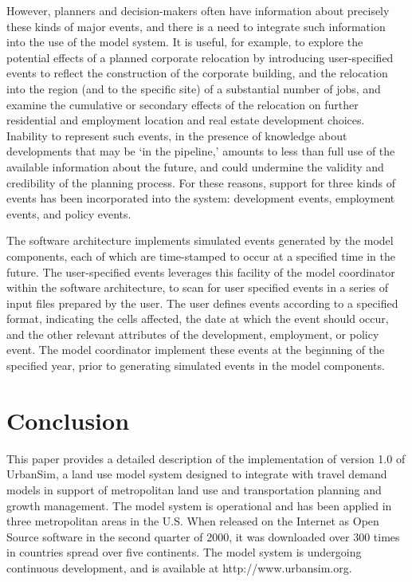 \documentclass[fleqn]{article}
\begin{document}
However, planners and decision-makers often have information about
precisely these kinds of major events, and there is a need to
integrate such information into the use of the model system.  It
is useful, for example, to explore the potential effects of a
planned corporate relocation by introducing user-specified events
to reflect the construction of the corporate building, and the
relocation into the region (and to the specific site) of a
substantial number of jobs, and examine the cumulative or
secondary effects of the relocation on further residential and
employment location and real estate development choices.  Inability
to represent such events, in the presence of knowledge about
developments that may be `in the pipeline,' amounts to less than
full use of the available information about the future, and could
undermine the validity and credibility of the planning process.
For these reasons, support for three kinds of events has been
incorporated into the system: development events, employment
events, and policy events.

The software architecture implements simulated events generated by
the model components, each of which are time-stamped to occur at a
specified time in the future.  The user-specified events leverages
this facility of the model coordinator within the software
architecture, to scan for user specified events in a series of
input files prepared by the user.  The user defines events
according to a specified format, indicating the cells affected,
the date at which the event should occur, and the other relevant
attributes of the development, employment, or policy event.  The
model coordinator implement these events at the beginning of the
specified year, prior to generating simulated events in the model
components.


\section{Conclusion}
This paper provides a detailed  description of the implementation
of version 1.0 of UrbanSim, a land use model system designed to
integrate with travel demand models in support of metropolitan
land use and transportation planning and growth management.  The
model system is operational and has been applied in three
metropolitan areas in the U.S. When released on the Internet as
Open Source software in the second quarter of 2000, it was
downloaded over 300 times in countries spread over five
continents.  The model system is undergoing continuous
development, and is available at {\sf http://www.urbansim.org}.
\end{document}
